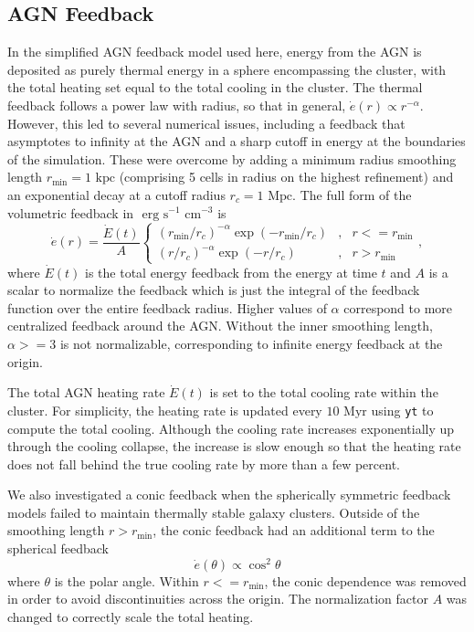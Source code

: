 \documentclass[iop,apjl, twocolappendix]{emulateapj}   %
\begin{document}
\subsection{AGN Feedback}
\label{sec:AGN_feedback}

In the simplified AGN feedback model used here, energy from the AGN is
deposited as purely thermal energy in a sphere encompassing the cluster, with
the total heating set equal to the total cooling in the cluster. The thermal
feedback follows a power law with radius, so that in general, $\dot{e} (r)
\propto r^{-\alpha}$. However, this led to several numerical issues, including
a feedback that asymptotes to infinity at the AGN and a sharp cutoff in energy
at the boundaries of the simulation. These were overcome by adding a minimum
radius smoothing length $r_{\text{min}} = 1 \text{ kpc}$ (comprising 5 cells in
radius on the highest refinement) and an exponential decay at a cutoff radius
$r_c = 1 \text{ Mpc}.$ The full form of the volumetric feedback in $\text{ erg}
\text{ s}^{-1} \text{ cm}^{-3}$ is
\begin{equation}
  \dot{e}(r) = \frac{\dot{E}(t)}{A}
  \left\{\begin{matrix}
    \left( r_{\text{min}}/r_c \right )^{-\alpha} \exp {\left ( -r_{\text{min}}/r_c \right )} & , &r <= r_{\text{min}} \\
    \left( r /r_c \right )^{-\alpha} \exp { \left ( -r/r_c \right )}                         & , &r >  r_{\text{min}}
  \end{matrix}\right.,
\end{equation}
where $\dot{E}(t)$ is the total energy feedback from the energy at time $t$ and
$A$ is a scalar to normalize the feedback which is just the integral of the
feedback function over the entire feedback radius. Higher values of $\alpha$
correspond to more centralized feedback around the AGN. Without the inner
smoothing length, $\alpha >= 3$ is not normalizable, corresponding to
infinite energy feedback at the origin.

The total AGN heating rate $\dot E(t)$ is set to the total cooling rate within
the cluster. For simplicity, the heating rate is updated every $10 \text{ Myr}$
using \texttt{yt} to compute the total cooling. Although the cooling rate
increases exponentially up through the cooling collapse, the increase is slow
enough so that the heating rate does not fall behind the true cooling rate by
more than a few percent.

We also investigated a conic feedback when the spherically symmetric feedback
models failed to maintain thermally stable galaxy clusters. Outside of the
smoothing length $r > r_{\text{min}}$, the conic feedback had an additional
term to the spherical feedback
\begin{equation}
	\dot{e}(\theta) \propto \cos^2 \theta 
\end{equation}
where $\theta$ is the polar angle. Within $r <= r_{\text{min}}$, the conic
dependence was removed in order to avoid discontinuities across the origin. The
normalization factor $A$ was changed to correctly scale the total heating.
\end{document}
